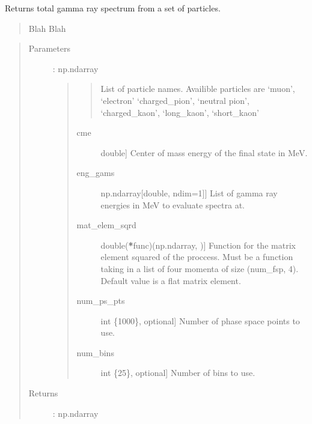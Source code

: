 \documentclass[letterpaper,10pt,english]{sphinxmanual}
\begin{document}
\begin{fulllineitems}
\label{\detokenize{modules:hazma.gamma_ray.gamma_ray}}
Returns total gamma ray spectrum from a set of particles.
\begin{quote}

Blah Blah
\end{quote}
\begin{quote}\begin{description}
\item[{Parameters}] \leavevmode
{} : np.ndarray
\begin{quote}
\begin{quote}

List of particle names. Availible particles are ‘muon’, ‘electron’
‘charged\_pion’, ‘neutral pion’, ‘charged\_kaon’, ‘long\_kaon’,
‘short\_kaon’
\end{quote}
\begin{description}
\item[{cme}] \leavevmode{[}double{]}
Center of mass energy of the final state in MeV.

\item[{eng\_gams}] \leavevmode{[}np.ndarray{[}double, ndim=1{]}{]}
List of gamma ray energies in MeV to evaluate spectra at.

\item[{mat\_elem\_sqrd}] \leavevmode{[}double({\color{red}\bfseries{}*}func)(np.ndarray, ){]}
Function for the matrix element squared of the proccess. Must be a
function taking in a list of four momenta of size (num\_fsp, 4).
Default value is a flat matrix element.

\item[{num\_ps\_pts}] \leavevmode{[}int \{1000\}, optional{]}
Number of phase space points to use.

\item[{num\_bins}] \leavevmode{[}int \{25\}, optional{]}
Number of bins to use.

\end{description}
\end{quote}

\item[{Returns}] \leavevmode
{} : np.ndarray
\begin{quote}


\end{quote}
\end{description}
\end{quote}
\end{fulllineitems}
\end{document}
